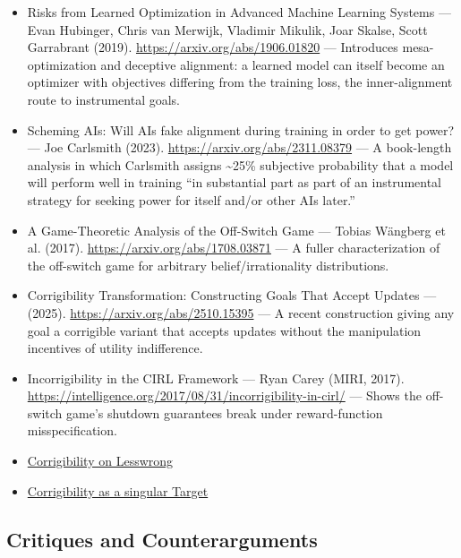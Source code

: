 \documentclass[11pt]{article}
\begin{document}
\begin{itemize}
  \item Risks from Learned Optimization in Advanced Machine Learning Systems --- Evan Hubinger, Chris van Merwijk, Vladimir Mikulik, Joar Skalse, Scott Garrabrant (2019). \url{https://arxiv.org/abs/1906.01820} --- Introduces mesa-optimization and deceptive alignment: a learned model can itself become an optimizer with objectives differing from the training loss, the inner-alignment route to instrumental goals.
  \item Scheming AIs: Will AIs fake alignment during training in order to get power? --- Joe Carlsmith (2023). \url{https://arxiv.org/abs/2311.08379} --- A book-length analysis in which Carlsmith assigns \textasciitilde{}25\% subjective probability that a model will perform well in training ``in substantial part as part of an instrumental strategy for seeking power for itself and/or other AIs later.''
  \item A Game-Theoretic Analysis of the Off-Switch Game --- Tobias Wängberg et al. (2017). \url{https://arxiv.org/abs/1708.03871} --- A fuller characterization of the off-switch game for arbitrary belief/irrationality distributions.
  \item Corrigibility Transformation: Constructing Goals That Accept Updates --- (2025). \url{https://arxiv.org/abs/2510.15395} --- A recent construction giving any goal a corrigible variant that accepts updates without the manipulation incentives of utility indifference.
  \item Incorrigibility in the CIRL Framework --- Ryan Carey (MIRI, 2017). \url{https://intelligence.org/2017/08/31/incorrigibility-in-cirl/} --- Shows the off-switch game's shutdown guarantees break under reward-function misspecification.
  \item \href{https://www.lesswrong.com/w/corrigibility-1}{Corrigibility on Lesswrong}
  \item \href{https://www.lesswrong.com/s/KfCjeconYRdFbMxsy/p/NQK8KHSrZRF5erTba}{Corrigibility as a singular Target}
\end{itemize}

\subsection*{Critiques and Counterarguments}
\end{document}
